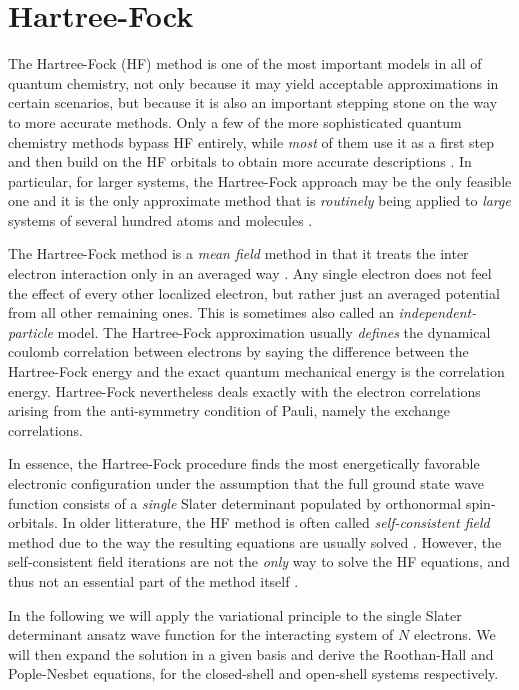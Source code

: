 \documentclass[../../master.tex]{subfiles}
\begin{document}
\renewcommand{\R}{{\bf R}}
\renewcommand{\r}{{\bf r}}
\newcommand{\x}{{\bf x}}
\newcommand{\psiz}{|\Psi_0\rangle}


\chapter{Hartree-Fock \label{HF}}
The Hartree-Fock (HF) method is one of the most important models in all of quantum chemistry, not only because it may yield acceptable approximations in certain scenarios, but because it is also an important stepping stone on the way to more accurate methods. Only a few of the more sophisticated quantum chemistry methods bypass HF entirely, while \emph{most} of them use it as a first step and then build on the HF orbitals to obtain more accurate descriptions \cite{szabo}. In particular, for larger systems, the Hartree-Fock approach may be the only feasible one and it is the only approximate method that is \emph{routinely} being applied to \emph{large} systems of several hundred atoms and molecules \cite{helgaker}.

The Hartree-Fock method is a \emph{mean field} method in that it treats the inter electron interaction only in an averaged way \cite{kvaal}. Any single electron does not feel the effect of every other localized electron, but rather just an averaged potential from all other remaining ones. This is sometimes also called an \emph{independent-particle} model. The Hartree-Fock approximation usually \emph{defines} the dynamical coulomb correlation between electrons by saying the difference between the Hartree-Fock energy and the exact quantum mechanical energy is the correlation energy. Hartree-Fock nevertheless deals exactly with the electron correlations arising from the anti-symmetry condition of Pauli, namely the exchange correlations. 

In essence, the Hartree-Fock procedure finds the most energetically favorable electronic configuration under the assumption that the full ground state wave function consists of a \emph{single} Slater determinant populated by orthonormal spin-orbitals. In older litterature, the HF method is often called \emph{self-consistent field} method due to the way the resulting equations are usually solved \cite{levine}. However, the self-consistent field iterations are not the \emph{only} way to solve the HF equations, and thus not an essential part of the method itself \cite{helgaker}.

In the following we will apply the variational principle to the single Slater determinant ansatz wave function for the interacting system of $N$ electrons. We will then expand the solution in a given basis and derive the Roothan-Hall and Pople-Nesbet equations, for the closed-shell and open-shell systems respectively. 
\end{document}
